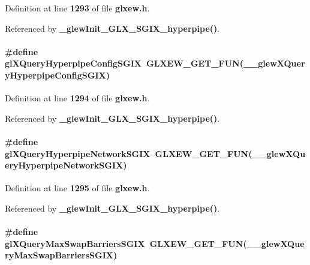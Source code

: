 Definition at line {\bf 1293} of file {\bf glxew.\+h}.



Referenced by {\bf \+\_\+glew\+Init\+\_\+\+G\+L\+X\+\_\+\+S\+G\+I\+X\+\_\+hyperpipe()}.

\paragraph[{gl\+X\+Query\+Hyperpipe\+Config\+S\+G\+IX}]{\setlength{\rightskip}{0pt plus 5cm}\#define gl\+X\+Query\+Hyperpipe\+Config\+S\+G\+IX~{\bf G\+L\+X\+E\+W\+\_\+\+G\+E\+T\+\_\+\+F\+UN}({\bf \+\_\+\+\_\+glew\+X\+Query\+Hyperpipe\+Config\+S\+G\+IX})}\label{glxew_8h_ab8406146a08497bcb77ea2c96489d4d3}


Definition at line {\bf 1294} of file {\bf glxew.\+h}.



Referenced by {\bf \+\_\+glew\+Init\+\_\+\+G\+L\+X\+\_\+\+S\+G\+I\+X\+\_\+hyperpipe()}.

\paragraph[{gl\+X\+Query\+Hyperpipe\+Network\+S\+G\+IX}]{\setlength{\rightskip}{0pt plus 5cm}\#define gl\+X\+Query\+Hyperpipe\+Network\+S\+G\+IX~{\bf G\+L\+X\+E\+W\+\_\+\+G\+E\+T\+\_\+\+F\+UN}({\bf \+\_\+\+\_\+glew\+X\+Query\+Hyperpipe\+Network\+S\+G\+IX})}\label{glxew_8h_a1a5282aaec162d48c287de4cefb30edb}


Definition at line {\bf 1295} of file {\bf glxew.\+h}.



Referenced by {\bf \+\_\+glew\+Init\+\_\+\+G\+L\+X\+\_\+\+S\+G\+I\+X\+\_\+hyperpipe()}.

\paragraph[{gl\+X\+Query\+Max\+Swap\+Barriers\+S\+G\+IX}]{\setlength{\rightskip}{0pt plus 5cm}\#define gl\+X\+Query\+Max\+Swap\+Barriers\+S\+G\+IX~{\bf G\+L\+X\+E\+W\+\_\+\+G\+E\+T\+\_\+\+F\+UN}({\bf \+\_\+\+\_\+glew\+X\+Query\+Max\+Swap\+Barriers\+S\+G\+IX})}\label{glxew_8h_ad0bbe3a961f33db264342e12ea2bf7ac}


